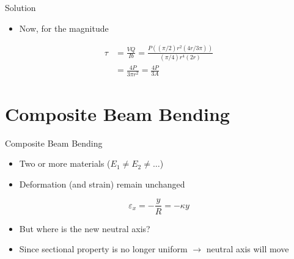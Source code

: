 \documentclass[10pt, svgnames]{beamer}
\begin{document}
\begin{frame}[label={sec:org82f021e}]{Solution}
\begin{itemize}
\item Now, for the magnitude
\end{itemize}

\begin{align*}
  \tau &= \frac{VQ}{Ib} = \frac{P ((\pi/2) r^{2} (4r/3\pi))}{(\pi/4)r^{4}(2r)} \\
       &= \frac{4P}{3 \pi r^{2}} = \frac{4P}{3A}
\end{align*}
\end{frame}

\section{Composite Beam Bending}
\label{composite-beam-bending}
\begin{frame}[label={sec:org7fac777}]{Composite Beam Bending}
\begin{itemize}
\item Two or more materials (\(E_{1} \neq E_{2} \neq \ldots\))

\item Deformation (and strain) remain unchanged
\end{itemize}

\[\varepsilon_x = -\frac{y}{R} = -\kappa y\]

\begin{itemize}
\item But where is the new neutral axis?

\item Since sectional property is no longer uniform \(\rightarrow\) neutral
axis will move
\end{itemize}
\end{frame}
\end{document}
